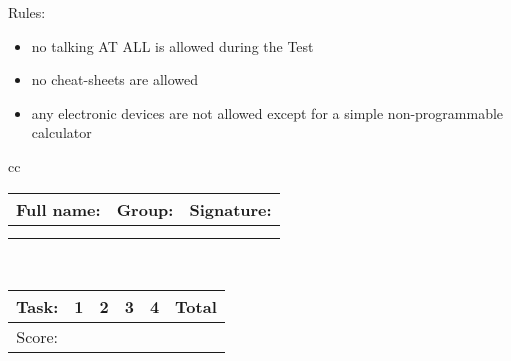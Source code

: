 \documentclass[]{exam}
\begin{document}




Rules:
\begin{itemize}
    \item no talking AT ALL is allowed during the Test
    \item no cheat-sheets are allowed
    \item any electronic devices are not allowed except for a simple non-programmable calculator  
\end{itemize}

\begin{tabular}{cc}
    \begin{tabular}[b]{|p{11cm}|c|c|}
    \hline
    Full name: & Group: & Signature:\\ \hline
     & & \\ 
     & & \\
     \hline
    \end{tabular}
\\

    \begin{tabular}[b]{|c|c|c|c|c|c|}
    \hline
    Task: & 1 & 2 & 3 & 4  & Total \\ \hline

    Score: & &  & &  &  \\ \hline
    \end{tabular}
\end{tabular}
\end{document}
